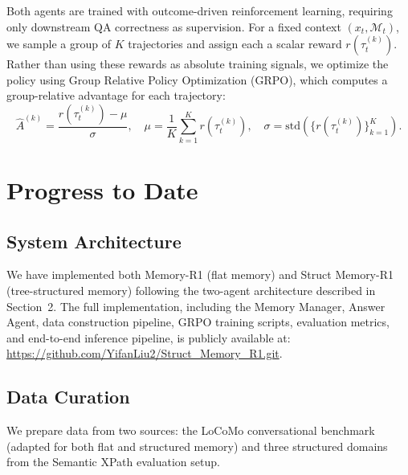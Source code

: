 \documentclass{article}
\theoremstyle{definition}
\begin{document}
 Both agents are trained with outcome-driven reinforcement learning, requiring only downstream QA correctness as supervision.
 For a fixed context $(x_t, \mathcal{M}_t)$, we sample a group of $K$ trajectories and assign each a scalar reward $r(\tau_t^{(k)})$. Rather than using these rewards as absolute training signals, we optimize the policy using Group Relative Policy Optimization (GRPO), which computes a group-relative advantage for each trajectory:
\[
\hat{A}^{(k)} = \frac{r(\tau_t^{(k)}) - \mu}{\sigma}, \quad \mu = \frac{1}{K}\sum_{k=1}^{K} r(\tau_t^{(k)}), \quad \sigma = \mathrm{std}\!\left(\{r(\tau_t^{(k)})\}_{k=1}^{K}\right).
\]



\section{Progress to Date}

\subsection{System Architecture}

We have implemented both Memory-R1 (flat memory) and Struct Memory-R1 (tree-structured memory) following the two-agent architecture described in Section~2. The full implementation, including the Memory Manager, Answer Agent, data construction pipeline, GRPO training scripts, evaluation metrics, and end-to-end inference pipeline, is publicly available at: \url{https://github.com/YifanLiu2/Struct_Memory_R1.git}.


\subsection{Data Curation}

We prepare data from two sources: the LoCoMo conversational benchmark (adapted for both flat and structured memory) and three structured domains from the Semantic XPath evaluation setup.
\end{document}
